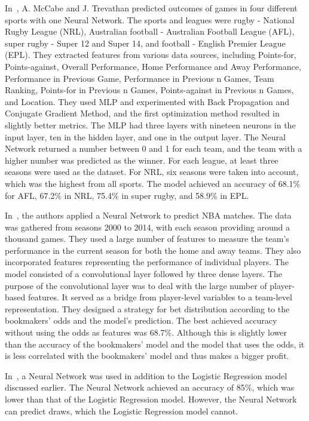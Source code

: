 \documentclass[thesis=M,english]{FITthesis}[2019/12/23]
\begin{document}
In~\cite{NN_more_sports}, A. McCabe and J. Trevathan predicted outcomes of games in four different sports with one Neural Network. The sports and leagues were rugby - National Rugby League (NRL), Australian football - Australian Football League (AFL), super rugby - Super 12 and Super 14, and football - English Premier League (EPL). They extracted features from various data sources, including Points-for, Points-against, Overall Performance, Home Performance and Away Performance, Performance in Previous Game, Performance in Previous n Games, Team Ranking, Points-for in Previous n Games, Points-against in Previous n Games, and Location. They used MLP and experimented with Back Propagation and Conjugate Gradient Method, and the first optimization method resulted in slightly better metrics. The MLP had three layers with nineteen neurons in the input layer, ten in the hidden layer, and one in the output layer. The Neural Network returned a number between 0 and 1 for each team, and the team with a higher number was predicted as the winner. For each league, at least three seasons were used as the dataset. For NRL, six seasons were taken into account, which was the highest from all sports. The model achieved an accuracy of 68.1\% for AFL, 67.2\% in NRL, 75.4\% in super rugby, and 58.9\% in EPL.

In~\cite{NBA_convolution}, the authors applied a Neural Network to predict NBA matches. The data was gathered from seasons 2000 to 2014, with each season providing around a thousand games. They used a large number of features to measure the team's performance in the current season for both the home and away teams. They also incorporated features representing the performance of individual players. The model consisted of a convolutional layer followed by three dense layers. The purpose of the convolutional layer was to deal with the large number of player-based features. It served as a bridge from player-level variables to a team-level representation. They designed a strategy for bet distribution according to the bookmakers' odds and the model's prediction. The best achieved accuracy without using the odds as features was 68.7\%. Although this is slightly lower than the accuracy of the bookmakers' model and the model that uses the odds, it is less correlated with the bookmakers' model and thus makes a bigger profit.

In~\cite{BPL_ANN_logistic_regression}, a Neural Network was used in addition to the Logistic Regression model discussed earlier. The Neural Network achieved an accuracy of 85\%, which was lower than that of the Logistic Regression model. However, the Neural Network can predict draws, which the Logistic Regression model cannot.
\end{document}
